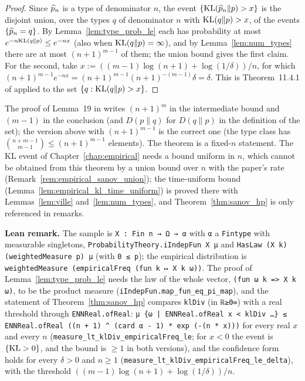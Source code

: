 \begin{proof}
\leanok
Since $\widehat{p}_n$ is a type of denominator $n$, the event $\{\mathrm{KL}(\widehat{p}_n \| p) > x\}$ is the
disjoint union, over the types $q$ of denominator $n$ with $\mathrm{KL}(q \| p) > x$, of the events
$\{\widehat{p}_n = q\}$. By Lemma~\ref{lem:type_prob_le} each has probability at most
$e^{-n \mathrm{KL}(q \| p)} \le e^{-nx}$ (also when $\mathrm{KL}(q\|p) = \infty$), and by Lemma~\ref{lem:num_types}
there are at most $(n + 1)^{m - 1}$ of them; the union bound gives the first claim. For the
second, take $x := ((m - 1)\log(n + 1) + \log(1/\delta))/n$, for which
$(n + 1)^{m - 1} e^{-nx} = (n + 1)^{m - 1} (n + 1)^{-(m - 1)} \delta = \delta$.
This is Theorem~11.4.1 of \cite{cover2006elements} applied to the set
$\{q : \mathrm{KL}(q \| p) > x\}$.
\end{proof}

\begin{remark}\label{rem:pconc_sanov_paper}
The proof of Lemma~19 in \cite{essakine2026tight} writes $(n + 1)^m$ in the intermediate
bound and $(m - 1)$ in the conclusion (and $D(p \| q)$ for $D(q \| p)$ in the definition of the
set); the version above with $(n + 1)^{m - 1}$ is the correct one (the type class has
$\binom{n + m - 1}{m - 1} \le (n + 1)^{m - 1}$ elements). The theorem is a fixed-$n$ statement.
The KL event of Chapter~\ref{chap:empirical} needs a bound uniform in $n$, which cannot be
obtained from this theorem by a union bound over $n$ with the paper's rate
(Remark~\ref{rem:empirical_sanov_union}); the time-uniform bound
(Lemma~\ref{lem:empirical_kl_time_uniform}) is proved there with Lemmas~\ref{lem:ville}
and~\ref{lem:num_types}, and Theorem~\ref{thm:sanov_hp} is only referenced in remarks.
\end{remark}

\textbf{Lean remark.} The sample is \texttt{X : Fin n → Ω → α} with \texttt{α} a
\texttt{Fintype} with measurable singletons, \texttt{ProbabilityTheory.iIndepFun X μ} and
\texttt{HasLaw (X k) (weightedMeasure p) μ} (with \texttt{0 ≤ p}); the empirical distribution is
\texttt{weightedMeasure (empiricalFreq (fun k ↦ X k ω))}. The proof of
Lemma~\ref{lem:type_prob_le} needs the law of the whole vector, \texttt{(fun ω k => X k ω)},
to be the product measure (\texttt{iIndepFun.map\_fun\_eq\_pi\_map}), and the statement of
Theorem~\ref{thm:sanov_hp} compares \texttt{klDiv} (in \texttt{ℝ≥0∞}) with a real threshold
through \texttt{ENNReal.ofReal}: \texttt{μ \{ω | ENNReal.ofReal x < klDiv …\} ≤ ENNReal.ofReal
((n + 1) \^{} (card α - 1) * exp (-(n * x)))} for every real $x$ and every $n$
(\texttt{measure\_lt\_klDiv\_empiricalFreq\_le}; for $x < 0$ the event is $\{\mathrm{KL} > 0\}$, and the bound
is $\ge 1$ in both versions), and the confidence form holds for every $\delta > 0$ and $n \ge 1$
(\texttt{measure\_lt\_klDiv\_empiricalFreq\_le\_delta}), with the threshold
$((m - 1)\log(n + 1) + \log(1/\delta))/n$.

